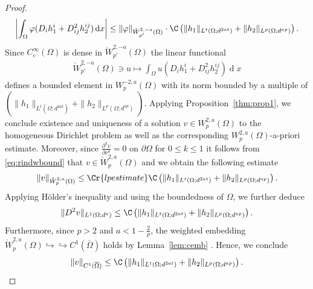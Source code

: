 \documentclass[12pt,a4paper,twoside]{article}
\newcommand{\diff}{\operatorname{d}\!}
\newcommand {\cbm}[1] {\tikz[baseline=(char.base)]{
            \node[shape=circle,draw,inner sep=2pt] (char) {\scriptsize\itshape{\textbf{#1}}};}}
\begin{document}
\begin{proof}
\begin{align}
    \left| \int_\Omega \varphi(D_ih^i_1+D^2_{ij}h^{ij}_2) \diff x \right| \le \|\varphi\| _{\mathring W^{2,-a}_{p'}(\Omega)} \cdot \C \left(
    \|h_1\|_{L^{t}(\Omega ;d^{2at})}
   + \|h_2\|_{L^{p}(\Omega ;d^{ap})}
    \right). \label{eq:hilfe1}
\end{align}
Since $C^\infty_c(\Omega)$ is dense in $\mathring W^{2,-a}_{p'}(\Omega)$ the linear functional
\begin{align*}
    \mathring W^{2,-a}_{p'} (\Omega) \ni u \mapsto \int_{\Omega} u( D_ih^i_1+D^2_{ij}h^{ij}_2) \diff x 
\end{align*}
defines a bounded element in $W^{-2,a}_{p}(\Omega)$ with its norm bounded by a multiple of   $ \left(     \|h_1\|_{L^{t}(\Omega ;d^{2at})}    + \|h_2\|_{L^{p}(\Omega ;d^{ap})}     \right) $. Applying Proposition~\ref{thm:prop1}, we conclude existence and uniqueness of a solution $v\in W^{2,a}_p(\Omega)$  to the homogeneous Dirichlet problem as well as the corresponding $W^{2,a}_p(\Omega)$-a-priori estimate. 
 Moreover, since $\frac{\partial^k v}{\partial \nu^k} = 0$ on $ \partial \Omega$ for $ 0\le k\le 1$ it follows from \eqref{eq:rindwbound} that $v\in \mathring W^{2,a}_p(\Omega)$ and we obtain the following estimate
\begin{align*}
    \|v\|_{\mathring W^{2,a}_p(\Omega)} \le \Cr{lpestimate}\C \left(
    \|h_1\|_{L^{t}(\Omega ;d^{2at})}
   + \|h_2\|_{L^{p}(\Omega ;d^{ap})}
    \right).
\end{align*}
Applying Hölder's inequality and using the boundedness of $\Omega$, we further deduce
\begin{align*}
    \|D^2v\|_{L^1(\Omega;d^a)} \le \C \left(
    \|h_1\|_{L^{t}(\Omega ;d^{2at})}
   + \|h_2\|_{L^{p}(\Omega ;d^{ap})}
    \right).
\end{align*}
Furthermore, since $p>2$ and $ a<1-\frac{2}{p}$, the weighted embedding $\mathring W^{2,a}_p(\Omega)\hookrightarrow\hookrightarrow C^1(\overline{\Omega})$ holds by Lemma~\ref{lem:cemb} \cbm c. Hence, we conclude
\begin{align*}
    \|v\|_{C^1(\overline{\Omega})} \le \C \left(
    \|h_1\|_{L^{t}(\Omega ;d^{2at})}
   + \|h_2\|_{L^{p}(\Omega ;d^{ap})}
    \right).
\end{align*}


\end{proof}
\end{document}
